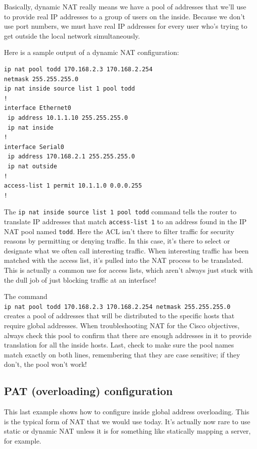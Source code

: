 \documentclass[b5paper,11pt]{memoir}
\begin{document}
Basically, dynamic NAT really means we have a pool of addresses that
we'll use to provide real IP addresses to a group of users on the
inside. Because we don't use port numbers, we must have real IP
addresses for every user who's trying to get outside the local network
simultaneously.

Here is a sample output of a dynamic NAT configuration:

\begin{verbatim}
ip nat pool todd 170.168.2.3 170.168.2.254
netmask 255.255.255.0
ip nat inside source list 1 pool todd
!
interface Ethernet0
 ip address 10.1.1.10 255.255.255.0
 ip nat inside
!
interface Serial0
 ip address 170.168.2.1 255.255.255.0
 ip nat outside
!
access-list 1 permit 10.1.1.0 0.0.0.255
!
\end{verbatim}

The \texttt{ip\ nat\ inside\ source\ list\ 1\ pool\ todd} command tells
the router to translate IP addresses that match \texttt{access-list\ 1}
to an address found in the IP NAT pool named \texttt{todd}. Here the ACL
isn't there to filter traffic for security reasons by permitting or
denying traffic. In this case, it's there to select or designate what we
often call interesting traffic. When interesting traffic has been
matched with the access list, it's pulled into the NAT process to be
translated. This is actually a common use for access lists, which aren't
always just stuck with the dull job of just blocking traffic at an
interface!

The command
\texttt{ip\ nat\ pool\ todd\ 170.168.2.3\ 170.168.2.254\ netmask\ 255.255.255.0}
creates a pool of addresses that will be distributed to the specific
hosts that require global addresses. When troubleshooting NAT for the
Cisco objectives, always check this pool to confirm that there are
enough addresses in it to provide translation for all the inside hosts.
Last, check to make sure the pool names match exactly on both lines,
remembering that they are case sensitive; if they don't, the pool won't
work!



\subsection{PAT (overloading) configuration}

This last example shows how to configure inside global address
overloading. This is the typical form of NAT that we would use today.
It's actually now rare to use static or dynamic NAT unless it is for
something like statically mapping a server, for example.
\end{document}
